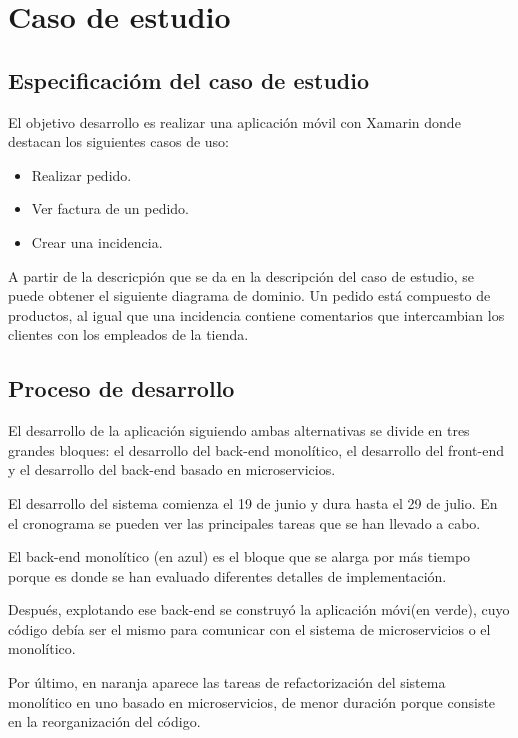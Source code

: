 \documentclass[11pt,a4paper]{article}
\begin{document}
\section{Caso de estudio}

\subsection{Especificacióm del caso de estudio}

El objetivo desarrollo es realizar una aplicación móvil con Xamarin donde destacan los siguientes casos de uso:

\begin{itemize}

\item Realizar pedido.

\item Ver factura de un pedido.

\item Crear una incidencia.

\end{itemize}

A partir de la descricpión que se da en la descripción del caso de estudio, se puede obtener el siguiente diagrama de dominio. Un pedido está compuesto de productos, al igual que una incidencia contiene comentarios que intercambian los clientes con los empleados de la tienda.

\subsection{Proceso de desarrollo}

El desarrollo de la aplicación siguiendo ambas alternativas se divide en tres grandes bloques: el desarrollo del back-end monolítico, el desarrollo del front-end y el desarrollo del back-end basado en microservicios.

El desarrollo del sistema comienza el 19 de junio y dura hasta el 29 de julio. En el cronograma se pueden ver las principales tareas que se han llevado a cabo. 

El back-end monolítico (en azul) es el bloque que se alarga por más tiempo porque es donde se han evaluado diferentes detalles de implementación. 

Después, explotando ese back-end se construyó la aplicación móvi(en verde), cuyo código debía ser el mismo para comunicar con el sistema de microservicios o el monolítico.

Por último, en naranja aparece las tareas de refactorización del sistema monolítico en uno basado en microservicios, de menor duración porque consiste en la reorganización del código.
\end{document}
